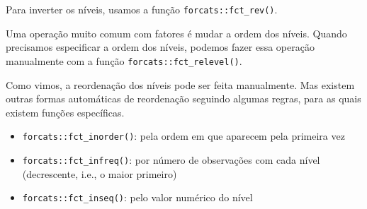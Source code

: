 \documentclass[
]{book}
\newenvironment{Shaded}{\begin{snugshade}}{\end{snugshade}}
\newcommand{\CommentTok}[1]{\textcolor[rgb]{0.37,0.37,0.37}{\textit{#1}}}
\newcommand{\DocumentationTok}[1]{\textcolor[rgb]{0.37,0.37,0.37}{\textbf{\textit{#1}}}}
\newcommand{\FunctionTok}[1]{\textcolor[rgb]{0,0,0}{#1}}
\newcommand{\NormalTok}[1]{#1}
\newcommand{\SpecialCharTok}[1]{\textcolor[rgb]{0,0,0}{#1}}
\newcommand{\StringTok}[1]{\textcolor[rgb]{0.5,0.5,0.5}{#1}}
\providecommand{\tightlist}{%
  \setlength{\itemsep}{0pt}\setlength{\parskip}{0pt}}
\begin{document}
Para inverter os níveis, usamos a função \texttt{forcats::fct\_rev()}.

\begin{Shaded}
\end{Shaded}

Uma operação muito comum com fatores é mudar a ordem dos níveis. Quando precisamos especificar a ordem dos níveis, podemos fazer essa operação manualmente com a função \texttt{forcats::fct\_relevel()}.

\begin{Shaded}
\end{Shaded}

Como vimos, a reordenação dos níveis pode ser feita manualmente. Mas existem outras formas automáticas de reordenação seguindo algumas regras, para as quais existem funções específicas.

\begin{itemize}
\tightlist
\item
  \texttt{forcats::fct\_inorder()}: pela ordem em que aparecem pela primeira vez
\item
  \texttt{forcats::fct\_infreq()}: por número de observações com cada nível (decrescente, i.e., o maior primeiro)
\item
  \texttt{forcats::fct\_inseq()}: pelo valor numérico do nível
\end{itemize}
\end{document}

